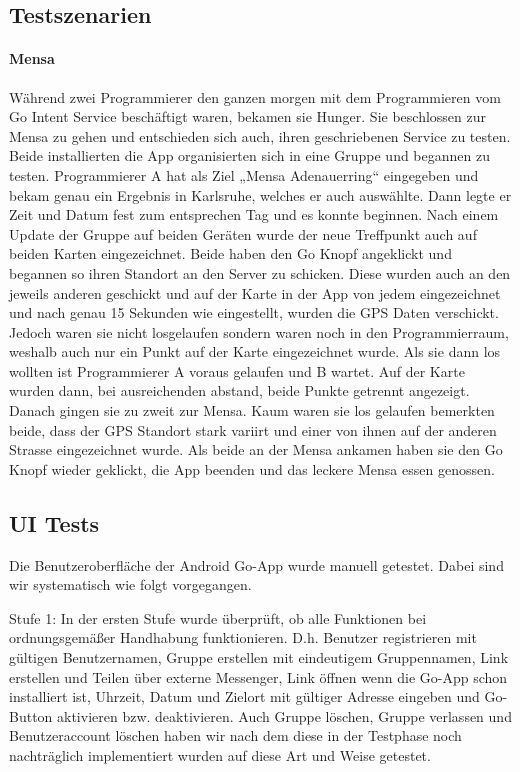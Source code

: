 \subsection{Testszenarien}

\paragraph{Mensa}
Während zwei Programmierer den ganzen morgen mit dem Programmieren vom Go Intent Service beschäftigt waren, bekamen sie Hunger. Sie beschlossen zur Mensa zu gehen und entschieden sich auch, ihren geschriebenen Service zu testen. Beide installierten die App organisierten sich in eine Gruppe und begannen zu testen. Programmierer A hat als Ziel „Mensa Adenauerring“ eingegeben und bekam genau ein Ergebnis in Karlsruhe, welches er auch auswählte. Dann legte er Zeit und Datum fest zum entsprechen Tag und es konnte beginnen. Nach einem Update der Gruppe auf beiden Geräten wurde der neue Treffpunkt auch auf beiden Karten eingezeichnet.
Beide haben den Go Knopf angeklickt und begannen so ihren Standort an den Server zu schicken. Diese wurden auch an den jeweils anderen geschickt und auf der Karte in der App von jedem eingezeichnet und nach genau 15 Sekunden wie eingestellt, wurden die GPS Daten verschickt. Jedoch waren sie nicht losgelaufen sondern waren noch in den Programmierraum, weshalb auch nur ein Punkt auf der Karte eingezeichnet wurde. Als sie dann los wollten ist Programmierer A voraus gelaufen und B wartet. Auf der Karte wurden dann, bei ausreichenden abstand, beide Punkte getrennt angezeigt. Danach gingen sie zu zweit zur Mensa. Kaum waren sie los gelaufen bemerkten beide, dass der GPS Standort stark variirt und einer von ihnen auf der anderen Strasse eingezeichnet wurde.
Als beide an der Mensa ankamen haben sie den Go Knopf wieder geklickt, die App beenden und das leckere Mensa essen genossen.

\subsection{UI Tests}
Die Benutzeroberfläche der Android Go-App wurde manuell getestet. Dabei sind wir systematisch wie folgt vorgegangen.

Stufe 1: In der ersten Stufe wurde überprüft, ob alle Funktionen bei ordnungsgemäßer Handhabung funktionieren. D.h. Benutzer registrieren mit gültigen Benutzernamen,
Gruppe erstellen mit eindeutigem Gruppennamen, Link erstellen und Teilen über externe Messenger, Link öffnen wenn die Go-App schon installiert ist, Uhrzeit, Datum und
Zielort mit gültiger Adresse eingeben und Go-Button aktivieren bzw. deaktivieren. Auch Gruppe löschen, Gruppe verlassen und Benutzeraccount löschen haben wir nach dem diese
in der Testphase noch nachträglich implementiert wurden auf diese Art und Weise getestet.

